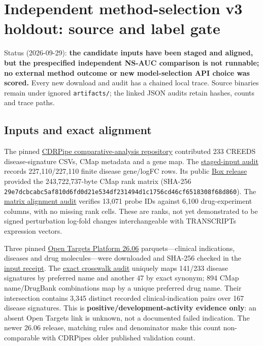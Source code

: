 \documentclass[
  10pt,
]{ctexart}
\author{}
\date{}
\begin{document}
\section{Independent method-selection v3 holdout: source and label
gate}\label{independent-method-selection-v3-holdout-source-and-label-gate}

Status (2026-09-29): \textbf{the candidate inputs have been staged and
aligned, but the prespecified independent NS-AUC comparison is not
runnable; no external method outcome or new model-selection API choice
was scored.} Every new download and audit has a chained local trace.
Source binaries remain under ignored \texttt{artifacts/\allowbreak{}}; the linked
JSON audits retain hashes, counts and trace paths.

\subsection{Inputs and exact
alignment}\label{inputs-and-exact-alignment}

The pinned
\href{https://github.com/enockniyonkuru/cdrpipe-comparative-analysis}{CDRPipe
comparative-analysis repository} contributed 233 CREEDS
disease-signature CSVs, CMap metadata and a gene map. The
\href{../benchmark/results/external_staged_inputs_audit.json}{staged-input
audit} records 227,110/227,110 finite disease gene/logFC rows. Its
public
\href{https://ucsf.box.com/s/m54ipylmdytjsqmlp7axnabvjh2q8lwl}{Box
release} provided the 243,722,737-byte CMap rank matrix (SHA-256
\texttt{29e7dcbcabc5af\allowbreak{}810d6fd0d21e53\allowbreak{}4df231494d1c17\allowbreak{}56cd46cf651830\allowbreak{}8f68d860}).
The
\href{../benchmark/results/external_cmap_matrix_alignment_audit.json}{matrix
alignment audit} verifies 13,071 probe IDs against 6,100 drug-experiment
columns, with no missing rank cells. These are ranks, not yet
demonstrated to be signed perturbation log-fold changes interchangeable
with TRANSCRIPT\textquotesingle s expression vectors.

Three pinned
\href{https://platform-docs.opentargets.org/data-access}{Open Targets
Platform 26.06} parquets---clinical indications, diseases and drug
molecules---were downloaded and SHA-256 checked in the
\href{../benchmark/results/external_opentargets_inputs_audit.json}{input
receipt}. The
\href{../benchmark/results/external_exact_crosswalk_audit.json}{exact
crosswalk audit} uniquely maps 141/233 disease signatures by preferred
name and another 47 by exact synonym; 894 CMap name/DrugBank
combinations map by a unique preferred drug name. Their intersection
contains 3,345 distinct recorded clinical-indication pairs over 167
disease signatures. This is \textbf{positive/development-activity
evidence only}: an absent Open Targets link is unknown, not a documented
failed indication. The newer 26.06 release, matching rules and
denominator make this count non-comparable with
CDRPipe\textquotesingle s older published validation count.
\end{document}
